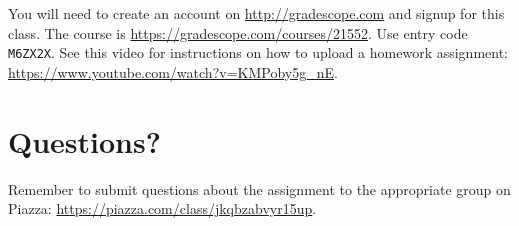 \documentclass[11pt]{article}
\begin{document}
\noindent You will need to create an account on \url{http://gradescope.com} and signup for this class. The course is \href{https://gradescope.com/courses/21552}{\url{https://gradescope.com/courses/21552}}. Use entry code {\tt M6ZX2X}. See this video for instructions on how to upload a homework assignment: \href{https://www.youtube.com/watch?v=KMPoby5g_nE}{\url{https://www.youtube.com/watch?v=KMPoby5g_nE}}.


\section{Questions?}
Remember to submit questions about the assignment to the appropriate group on Piazza: \href{https://piazza.com/class/jkqbzabvyr15up}{\url{https://piazza.com/class/jkqbzabvyr15up}}.
\end{document}
